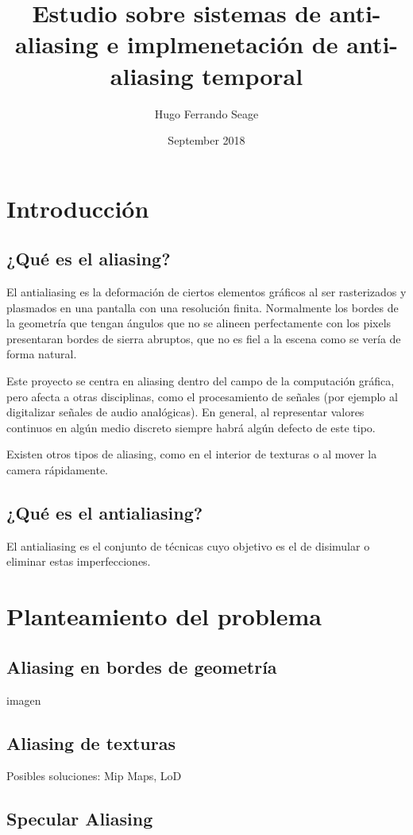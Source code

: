 \documentclass[withindex, glossary]{cam-thesis}
\title{Estudio sobre sistemas de anti-aliasing e implmenetación de anti-aliasing temporal}
\author{Hugo Ferrando Seage}
\date{September 2018}
\begin{document}
\frontmatter{}

\chapter{Introducción}
\section{¿Qué es el aliasing?}

El antialiasing es la deformación de ciertos elementos gráficos al ser rasterizados y plasmados en una pantalla con una resolución finita\cite{Mitchell:1988:RFC:378456.378514}. Normalmente los bordes de la geometría que tengan ángulos que no se alineen perfectamente con los pixels presentaran bordes de sierra abruptos, que no es fiel a la escena como se vería de forma natural.

Este proyecto se centra en aliasing dentro del campo de la computación gráfica, pero afecta a otras disciplinas, como el procesamiento de señales (por ejemplo al digitalizar señales de audio analógicas). En general, al representar valores continuos en algún medio discreto siempre habrá algún defecto de este tipo\cite{Mitchell:1988:RFC:378456.378514}.

Existen otros tipos de aliasing, como en el interior de texturas o al mover la camera rápidamente.

\section{¿Qué es el antialiasing?}

El antialiasing es el conjunto de técnicas cuyo objetivo es el de disimular o eliminar estas imperfecciones.

\chapter{Planteamiento del problema}

\section{Aliasing en bordes de geometría}
imagen

\section{Aliasing de texturas}
Posibles soluciones: Mip Maps, LoD

\section{Specular Aliasing}
\end{document}
